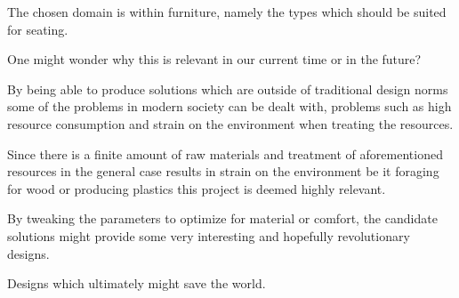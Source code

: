 The chosen domain is within furniture, namely the types which should be suited
for seating.

One might wonder why this is relevant in our current time or in the future?

By being able to produce solutions which are outside of traditional design norms
some of the problems in modern society can be dealt with, problems such as high
resource consumption and strain on the environment when treating the resources.

Since there is a finite amount of raw materials and treatment of aforementioned
resources in the general case results in strain on the environment be it
foraging for wood or producing plastics this project is deemed highly relevant.

By tweaking the parameters to optimize for material or comfort, the candidate
solutions might provide some very interesting and hopefully revolutionary
designs.

Designs which ultimately might save the world. 
